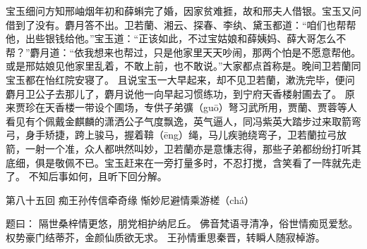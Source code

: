 \documentclass[12pt,oneside]{book}
\begin{document}
宝玉细问方知邢岫烟年初和薛蝌完了婚，因家贫难捱，故和邢夫人借银。宝玉又问借到了没有。麝月答不出。卫若蘭、湘云、探春、李纨、黛玉都道：“咱们也帮帮他，出些银钱给他。”宝玉道：“正该如此，不过宝姑娘和薛姨妈、薛大哥怎么不帮？”麝月道：“依我想来也帮过，只是他家里天天吵闹，那两个怕是不愿意帮他。或是邢姑娘见他家里乱着，不敢上前，也不敢说。”大家都点首称是。晚间卫若蘭同宝玉都在怡红院安寝了。
且说宝玉一大早起来，却不见卫若蘭，漱洗完毕，便问麝月卫公子去那儿了，麝月说他一向早起习惯练功，到宁府天香楼射圃去了。
原来贾珍在天香楼一带设个圃场，专供子弟彍（guō）弩习武所用，贾蘭、贾蓉等人看见有个佩戴金麒麟的潇洒公子气度飘逸，英气逼人，同冯紫英大踏步过来取箭弯弓，身手矫捷，跨上骏马，握着鞥（ēng）绳，马儿疾驰绕弯子，卫若蘭拉弓放箭，一射一个准，众人都哄然叫妙，卫若蘭亦是意慊志得，那些子弟都纷纷打听其底细，俱是敬佩不已。宝玉赶来在一旁打量多时，不忍打搅，含笑看了一阵就先走了。
不知后事如何，且听下回分解。
 
 
第八十五回 痴王孙传信牵奇缘 惭妙尼避情乘游槎（chá）

题曰：
隔世桑梓情更悠，朋党相护纳尼丘。
佛音梵语寻清净，俗世情痴觅爱愁。
权势豪门结蒂芥，金颜仙质欲无求。
王孙情重思秦晋，转瞬人随寂棹游。
\end{document}
